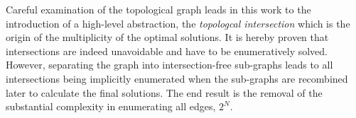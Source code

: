 \documentclass[conference]{IEEEtran}
\begin{document}

Careful examination of the topological graph leads in this work to the introduction of a high-level abstraction, the \textit{topologcal  intersection} which is the origin of the multiplicity of the optimal solutions. It is hereby proven that intersections are indeed unavoidable and have to be enumeratively solved. However, separating the graph into intersection-free sub-graphs leads to all intersections being implicitly enumerated when the sub-graphs are recombined later to calculate the final solutions. The end result is the removal of the substantial complexity in enumerating all edges, $2^N$. 
\end{document}
